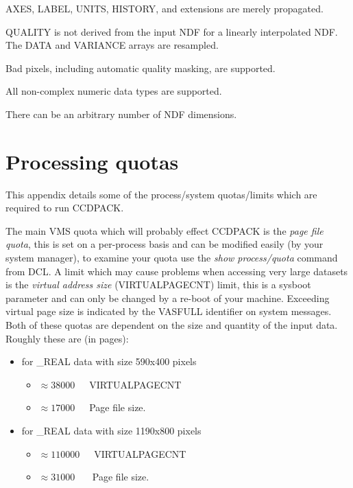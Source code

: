 {{{         \sstitem
            AXES, LABEL, UNITS, HISTORY, and extensions are merely
               propagated.

         \sstitem
            QUALITY is not derived from the input NDF for a linearly
               interpolated NDF. The DATA and VARIANCE arrays are
               resampled.

         \sstitem
         Bad pixels, including automatic quality masking, are supported.

         \sstitem
         All non-complex numeric data types are supported.

         \sstitem
         There can be an arbitrary number of NDF dimensions.
      }
   }
}

\newpage
\section{Processing quotas}

This appendix details some of the process/system quotas/limits which
are required to run CCDPACK.

The main VMS quota which will probably effect CCDPACK is the {\em page
file quota}, this is set on a per-process basis and can be modified
easily (by your system manager), to examine your quota use the {\em show
process/quota} command from DCL. A limit which may cause problems when
accessing very large datasets is the {\em virtual address size}
(VIRTUALPAGECNT) limit, this is a sysboot parameter and can only be
changed by a re-boot of your machine. Exceeding virtual page size is
indicated by the VASFULL identifier on system messages. Both of these
quotas are dependent on the size and quantity of the input data. Roughly
these are (in pages):
\begin{itemize}

\item for \_REAL data with size 590x400 pixels
   \begin{itemize}
      \item $\approx 38000$~~~VIRTUALPAGECNT
      \item $\approx 17000$~~~Page file size.
   \end{itemize}

\item for \_REAL data with size 1190x800 pixels
   \begin{itemize}
      \item $\approx 110000$~~~VIRTUALPAGECNT
      \item $\approx 31000 $~~~ Page file size.
   \end{itemize}

\end{itemize}

